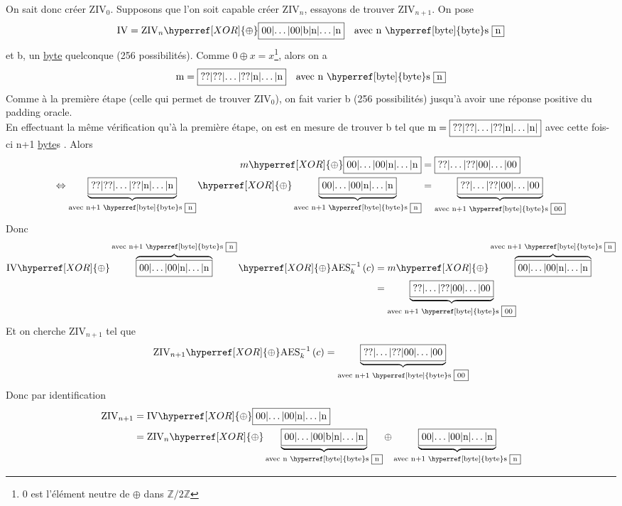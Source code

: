\documentclass[a4paper, 12pt]{article}
\begin{document}
\noindent On sait donc créer $\text{ZIV}_0$. Supposons que l'on soit capable créer $\text{ZIV}_n$, essayons de trouver $\text{ZIV}_{n+1}$. On pose 
$$\text{IV} = \text{ZIV}_n \hyperref[XOR]{\oplus} \fbox{00|$\dots$|00|b|n|$\dots$|n} \quad \text{avec n \hyperref[byte]{byte}s \fbox{n}}$$
 et b, un \hyperref[byte]{byte} quelconque (256 possibilités). Comme $0 \hyperref[XOR]{\oplus} x = x$\footnote{$0$ est l'élément neutre de \hyperref[XOR]{$\oplus$} dans $\mathbb{Z}/2\mathbb{Z}$}, alors on a 
$$\text{m} = \fbox{??|??|\dots|??|n|$\dots$|n} \quad \text{avec n \hyperref[byte]{byte}s \fbox{n}}$$
Comme à la première étape (celle qui permet de trouver $\text{ZIV}_0$), on fait varier b (256 possibilités) jusqu'à avoir une réponse positive du padding oracle. \\ En effectuant la même vérification qu'à la première étape, on est en mesure de trouver b tel que $\text{m} = \fbox{??|??|$\dots$|??|n|$\dots$|n|}$ avec cette fois-ci n+1 \hyperref[byte]{byte}s . Alors
\begin{align*}
	m \hyperref[XOR]{\oplus} \fbox{00|$\dots$|00|n|$\dots$|n} &= \fbox{??|$\dots$|??|00|$\dots$|00} \\
	\Leftrightarrow	\underbrace{\fbox{??|??|\dots|??|n|$\dots$|n}}_{\text{avec n+1 \hyperref[byte]{byte}s \fbox{n}}} \hyperref[XOR]{\oplus} \underbrace{\fbox{00|$\dots$|00|n|$\dots$|n}}_{\text{avec n+1 \hyperref[byte]{byte}s \fbox{n}}} &= \underbrace{\fbox{??|$\dots$|??|00|$\dots$|00}}_{\text{avec n+1 \hyperref[byte]{byte}s \fbox{00}}}
\end{align*}
Donc 
\begin{align*}
	\text{IV} \hyperref[XOR]{\oplus} \overbrace{\fbox{00|$\dots$|00|n|$\dots$|n}}^{\text{avec n+1 \hyperref[byte]{byte}s \fbox{n}}} \hyperref[XOR]{\oplus} \text{AES}^{-1}_k\left(c\right) &= m \hyperref[XOR]{\oplus} \overbrace{\fbox{00|$\dots$|00|n|$\dots$|n}}^{\text{avec n+1 \hyperref[byte]{byte}s \fbox{n}}}\\
					&= \underbrace{\fbox{??|$\dots$|??|00|$\dots$|00}}_{\text{avec n+1 \hyperref[byte]{byte}s \fbox{00}}}\end{align*}
Et on cherche $\text{ZIV}_{n+1}$ tel que 
$$\text{ZIV}_{n+1} \hyperref[XOR]{\oplus} \text{AES}^{-1}_k\left(c\right) = \underbrace{\fbox{??|$\dots$|??|00|$\dots$|00}}_{\text{avec n+1 \hyperref[byte]{byte}s \fbox{00}}}$$
Donc par identification
\begin{align*}
	\text{ZIV}_{n+1} &= \text{IV} \hyperref[XOR]{\oplus} \fbox{00|$\dots$|00|n|$\dots$|n}\\
			 &= \text{ZIV}_n \hyperref[XOR]{\oplus} \underbrace{\fbox{00|$\dots$|00|b|n|$\dots$|n}}_{\text{avec n \hyperref[byte]{byte}s \fbox{n}}} \oplus \underbrace{\fbox{00|$\dots$|00|n|$\dots$|n}}_{\text{avec n+1 \hyperref[byte]{byte}s \fbox{n}}}
\end{align*}
\end{document}
